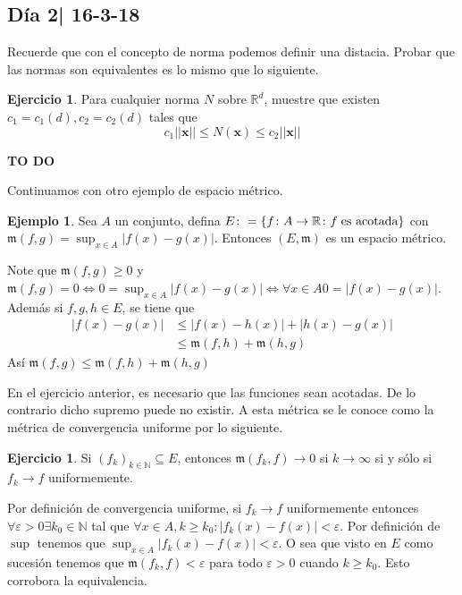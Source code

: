 \documentclass[12pt]{article}
\theoremstyle{plain}
\theoremstyle{definition}
\newtheorem{Ex}[Th]{Ejemplo}               %
\newtheorem{Ej}[Th]{Ejercicio}
\theoremstyle{remark}
\numberwithin{equation}{section}
\newcommand{\bN}{\mathbb{N}}        %
\newcommand{\bR}{\mathbb{R}}        %
\newcommand{\mm}{\mathfrak{m}}      %
\renewcommand{\geq}{\geqslant}      %
\renewcommand{\leq}{\leqslant}      %
\renewcommand{\:}{\colon}           %
\renewcommand{\vec}[1]{\mathbf{#1}}
\newcommand{\vx}{\vec{x}}           %
\newcommand{\conj}[1]{\left\lbrace#1\right\rbrace}
\begin{document}
\begin{multicols}{2}
\subsection{Día 2| 16-3-18}

Recuerde que con el concepto de norma podemos definir una distacia. Probar que las normas son equivalentes es lo mismo que lo siguiente.

\begin{Ej}
  Para cualquier norma $N$ sobre $\bR^d$, muestre que existen $c_1=c_1(d), c_2=c_2(d)$ tales que $$c_1||\vx||\leq N(\vx)\leq c_2||\vx||$$
\end{Ej}

\begin{ptcb}
\bf{TO DO}
\end{ptcb}
Continuamos con otro ejemplo de espacio métrico.

\begin{Ex}
Sea $A$ un conjunto, defina $E\colon=\conj{f\colon A\to\bR\colon f\hspace{1mm}\text{es acotada}}$ con $\mm(f,g)=\sup_{x\in A}|f(x)-g(x)|$. Entonces $(E,\mm)$ es un espacio métrico.
\end{Ex}

\begin{ptcbp}
Note que $\mm(f,g)\geq 0$ y $\mm(f,g)=0\iff 0=\sup_{x\in A}|f(x)-g(x)|\iff \forall x\in A 0=|f(x)-g(x)|$. Además si $f,g,h\in E$, se tiene que
\begin{align*}
  |f(x)-g(x)| &\leq |f(x)-h(x)|+|h(x)-g(x)| \\
&\leq \mm(f,h)+\mm(h,g)
\end{align*}
Así $\mm(f,g)\leq \mm(f,h)+\mm(h,g)$
\end{ptcbp}
En el ejercicio anterior, es necesario que las funciones sean acotadas. De lo contrario dicho supremo puede no existir.
A esta métrica se le conoce como la métrica de convergencia uniforme por lo siguiente.

\begin{Ej}
  Si $(f_k)_{k\in\bN}\subseteq E$, entonces $\mm(f_k,f)\to 0$ si $k\to\infty$ si y sólo si $f_k\to f$ uniformemente.
 \end{Ej}
\begin{ptcb}
 Por definición de convergencia uniforme, si $f_k\to f$ uniformemente entonces $\forall\varepsilon >0\exists k_0\in\bN$ tal que $\forall x\in A, k\geq k_0\colon |f_k(x)-f(x)|<\varepsilon$. Por definición de $\sup$ tenemos que $\sup_{x\in A}|f_k(x)-f(x)|<\varepsilon$. O sea que visto en $E$ como sucesión tenemos que $\mm(f_k,f)<\varepsilon$ para todo $\varepsilon>0$ cuando $k\geq k_0$. Esto corrobora la equivalencia.


\end{ptcb}
\end{multicols}
\end{document}
